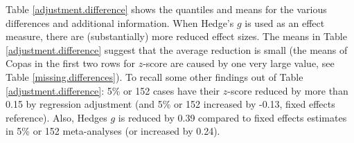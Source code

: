 \documentclass[11pt,a4paper,twoside]{book}\usepackage[]{graphicx}\usepackage[]{color}
\begin{document}
Table \ref{adjustment.difference} shows the quantiles and means for the various differences and additional information. When Hedge's $g$ is used as an effect measure, there are (substantially) more reduced effect sizes. The means in Table \ref{adjustment.difference} suggest that the average reduction is small (the means of Copas in the first two rows for $z$-score are caused by one very large value, see Table \ref{missing.differences}). To recall some other findings out of Table \ref{adjustment.difference}: 5\% or 152 cases have their $z$-score reduced by more than 0.15 by regression adjustment (and 5\% or 152 increased by -0.13, fixed effects reference). Also, Hedges $g$ is reduced by 0.39 compared to fixed effects estimates in 5\% or 152 meta-analyses (or increased by 0.24). 

\end{document}
